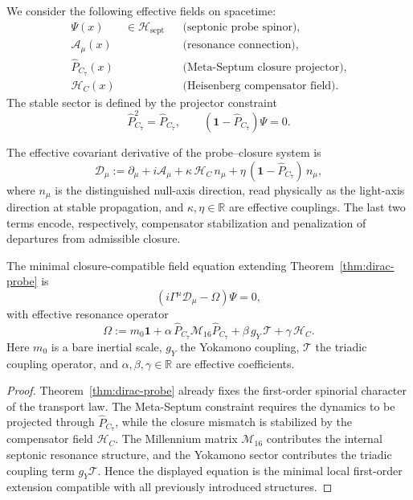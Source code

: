 \begin{definition}
We consider the following effective fields on spacetime:
\begin{align*}
  \Psi(x) &\in \mathcal H_{\mathrm{sept}}
    &&\text{(septonic probe spinor)},\\
  \mathcal A_\mu(x)
    &&&\text{(resonance connection)},\\
  \hat P_{C_7}(x)
    &&&\text{(Meta-Septum closure projector)},\\
  \mathcal H_C(x)
    &&&\text{(Heisenberg compensator field)}.
\end{align*}
The stable sector is defined by the projector constraint
\[
  \hat P_{C_7}^2 = \hat P_{C_7},
  \qquad
  (\mathbf 1-\hat P_{C_7})\Psi = 0.
\]
\end{definition}

\begin{definition}
The effective covariant derivative of the probe--closure system is
\[
  \mathcal D_\mu
  :=
  \partial_\mu
  + i\mathcal A_\mu
  + \kappa\,\mathcal H_C\,n_\mu
  + \eta\,(\mathbf 1-\hat P_{C_7})\,n_\mu,
\]
where $n_\mu$ is the distinguished null-axis direction, read physically as the light-axis direction at stable propagation, and
$\kappa,\eta\in\mathbb R$ are effective couplings.
The last two terms encode, respectively, compensator stabilization and
penalization of departures from admissible closure.
\end{definition}

\begin{theorem}
\label{thm:master-field-equation}
The minimal closure-compatible field equation extending
Theorem~\ref{thm:dirac-probe} is
\[
  \left(
    i\Gamma^\mu\mathcal D_\mu
    - \Omega
  \right)\Psi = 0,
\]
with effective resonance operator
\[
  \Omega
  :=
  m_0\mathbf 1
  + \alpha\,\hat P_{C_7}\mathcal M_{16}\hat P_{C_7}
  + \beta\,g_Y\,\mathcal T
  + \gamma\,\mathcal H_C.
\]
Here $m_0$ is a bare inertial scale, $g_Y$ the Yokamono coupling,
$\mathcal T$ the triadic coupling operator, and
$\alpha,\beta,\gamma\in\mathbb R$ are effective coefficients.
\end{theorem}

\begin{proof}
Theorem~\ref{thm:dirac-probe} already fixes the first-order spinorial
character of the transport law.
The Meta-Septum constraint requires the dynamics to be projected through
$\hat P_{C_7}$, while the closure mismatch is stabilized by the
compensator field $\mathcal H_C$.
The Millennium matrix $\mathcal M_{16}$ contributes the internal
septonic resonance structure, and the Yokamono sector contributes the
triadic coupling term $g_Y\mathcal T$.
Hence the displayed equation is the minimal local first-order extension
compatible with all previously introduced structures.
\end{proof}

